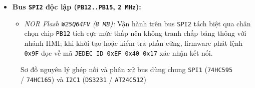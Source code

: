 \begin{itemize}[nosep]
\begin{itemize}[nosep]
        \item \textit{Hộp đen \texttt{AT24C512 EEPROM} (\texttt{0x50}):} Dung lượng \texttt{64~KB} (\texttt{65\,536 Bytes}) tổ chức theo trang \texttt{128 Bytes}; vùng đầu (\texttt{0x0000}) lưu khối tiêu đề kiểm tra \texttt{CRC32}, còn vùng dữ liệu (\texttt{0x0080}) lưu bộ đệm vòng 32 bản ghi bước \texttt{32 Bytes} kèm \texttt{CRC16} nhằm bảo toàn nhật ký khi mất điện mà không ghi vượt ranh giới trang.
        \item \textit{Phân xử bus:} Hai thiết bị dùng chung đường truyền cực máng hở \texttt{PB6/PB7} nối điện trở kéo lên $R_{p1}, R_{p2}$ về nguồn \texttt{+3.3~V}, đồng thời mọi thao tác đọc/ghi thời gian hay hộp đen đều được tuần tự hóa qua khóa \textit{mutex} riêng của bus \texttt{I2C1} để tránh xung đột khung truyền.
    \end{itemize}
    \newpage
    \item \textbf{Bus \texttt{SPI2} độc lập (\texttt{PB12..PB15}, \texttt{2~MHz}):}
    \begin{itemize}[nosep]
        \item \textit{NOR Flash \texttt{W25Q64FV} (\texttt{8~MB}):} Vận hành trên bus \texttt{SPI2} tách biệt qua chân chọn chip \texttt{PB12} tích cực mức thấp nên không tranh chấp băng thông với nhánh HMI; khi khởi tạo hoặc kiểm tra phần cứng, firmware phát lệnh \texttt{0x9F} đọc về mã \texttt{JEDEC ID 0xEF 0x40 0x17} xác nhận kết nối.
    \end{itemize}
\end{itemize}

\begin{figure}[H]
\centering

\caption{Sơ đồ nguyên lý ghép nối và phân xử bus dùng chung \texttt{SPI1} (\texttt{74HC595} / \texttt{74HC165}) và \texttt{I2C1} (\texttt{DS3231} / \texttt{AT24C512})}
\label{fig:shared_buses}
\end{figure}


